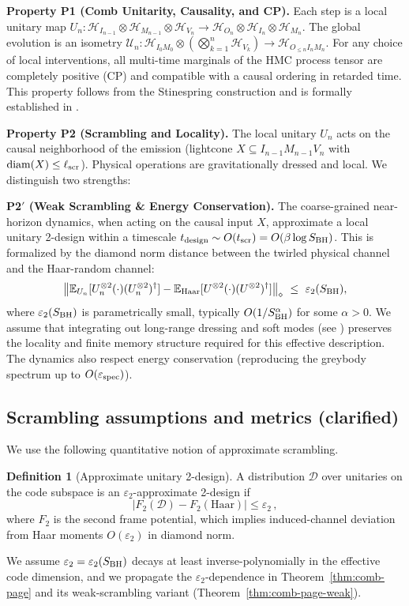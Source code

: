 \documentclass[a4paper,11pt]{article}
\newcommand{\HMC}{\textsc{HMC}\xspace}
\theoremstyle{plain}
\theoremstyle{definition}
\newtheorem{definition}{Definition}
\theoremstyle{remark}
\begin{document}
\textbf{Property P1 (Comb Unitarity, Causality, and CP).}
Each step is a local unitary map $U_n: \mathcal{H}_{I_{n-1}}\otimes \mathcal{H}_{M_{n-1}}\otimes \mathcal{H}_{V_n} \to \mathcal{H}_{O_n} \otimes \mathcal{H}_{I_n}\otimes \mathcal{H}_{M_n}$. The global evolution is an isometry $\mathcal{U}_n: \mathcal{H}_{I_0 M_0} \otimes (\bigotimes_{k=1}^n \mathcal{H}_{V_k}) \to \mathcal{H}_{O_{\le n} I_n M_n}$. For any choice of local interventions, all multi-time marginals of the \HMC{} process tensor are completely positive (CP) and compatible with a causal ordering in retarded time.
This property follows from the Stinespring construction and is formally established in .


\textbf{Property P2 (Scrambling and Locality).}
The local unitary $U_n$ acts on the causal neighborhood of the emission (lightcone $X\subseteq I_{n-1}M_{n-1}V_n$ with ${\rm diam}(X)\le \ell_{\rm scr}$). Physical operations are gravitationally dressed and local. We distinguish two strengths:

\textbf{P2$'$ (Weak Scrambling \& Energy Conservation).} The coarse-grained near-horizon dynamics, when acting on the causal input $X$, approximate a local unitary 2-design within a timescale $t_{\rm design} \sim O(t_{\rm scr}) = O(\beta \log S_{\rm BH})$. This is formalized by the diamond norm distance between the twirled physical channel and the Haar-random channel:
\begin{equation}
\left\| \mathbb{E}_{U_n}[U_n^{\otimes 2} (\cdot) (U_n^{\otimes 2})^\dagger] - \mathbb{E}_{\rm Haar}[U^{\otimes 2} (\cdot) (U^{\otimes 2})^\dagger]\right\|_\diamond \ \le\ \varepsilon_2(S_{\rm BH}),
\end{equation}
where $\varepsilon_2(S_{\rm BH})$ is parametrically small, typically $O(1/S_{\rm BH}^\alpha)$ for some $\alpha>0$. We assume that integrating out long-range dressing and soft modes (see ) preserves the locality and finite memory structure required for this effective description. The dynamics also respect energy conservation (reproducing the greybody spectrum up to $O(\varepsilon_{\rm spec})$).

\subsection*{Scrambling assumptions and metrics (clarified)}
We use the following quantitative notion of approximate scrambling.
\begin{definition}[Approximate unitary 2-design]\label{def:approx-2design}
  A distribution $\mathcal{D}$ over unitaries on the code subspace is an $\varepsilon_2$-approximate 2-design if
  \[
    \big|F_2(\mathcal{D})-F_2(\mathrm{Haar})\big|\le \varepsilon_2\,,
  \]
  where $F_2$ is the second frame potential, which implies induced-channel deviation from Haar moments $O(\varepsilon_2)$ in diamond norm.
\end{definition}
We assume $\varepsilon_2=\varepsilon_2(S_{\rm BH})$ decays at least inverse-polynomially in the effective code dimension,
and we propagate the $\varepsilon_2$-dependence in Theorem~\ref{thm:comb-page} and its weak-scrambling variant (Theorem~\ref{thm:comb-page-weak}).
\end{document}

